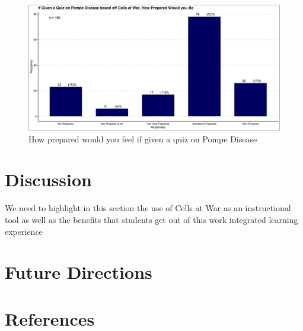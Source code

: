 \documentclass{article}
\begin{document}
\begin{figure}[H]
	\includegraphics[width=\textwidth]{figures_4f06/how_prepared_if_tested_on_pompe_based_off_cellsatwar.jpg}
	\caption{How prepared would you feel if given a quiz on Pompe Disease}
	\label{fig:8}
\end{figure}

\section{Discussion}

We need to highlight in this section the use of Cells at War as an instructional tool as well as the benefits that students get out of this work integrated learning experience

\section{Future Directions}

\clearpage\newpage
\section{References}


\nocite{*}
\printbibliography[heading=none, sorting=nyt]
\newpage
\end{document}

